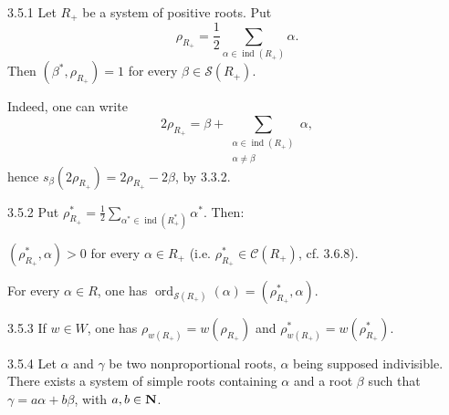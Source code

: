 \begin{proposition}{3.5.1}\label{XXI.3.5.1}
Let $R_+$ be a system of positive roots. Put
\[
\rho_{R_+}=\frac12\sum_{\alpha\in\operatorname{ind}(R_+)}\alpha.
\]
Then $(\beta^*,\rho_{R_+})=1$ for every $\beta\in\mathcal S(R_+)$.
\end{proposition}
Indeed, one can write
\[
2\rho_{R_+}=\beta+\sum_{\substack{\alpha\in\operatorname{ind}(R_+)\\\alpha\ne\beta}}\alpha,
\]
hence $s_\beta(2\rho_{R_+})=2\rho_{R_+}-2\beta$, by 3.3.2.
\begin{corollary}{3.5.2}\label{XXI.3.5.2}
Put $\rho_{R_+}^*=\frac12\sum_{\alpha^*\in\operatorname{ind}(R_+^*)}\alpha^*$. Then:
\begin{enumeratei}
\item $(\rho_{R_+}^*,\alpha)>0$ for every $\alpha\in R_+$ (i.e. $\rho_{R_+}^*\in\mathcal C(R_+)$, cf. 3.6.8).
\item For every $\alpha\in R$, one has $\operatorname{ord}_{\mathcal S(R_+)}(\alpha)=(\rho_{R_+}^*,\alpha)$.{\renewcommand{\thefootnote}{(12)}}
\end{enumeratei}
\end{corollary}
\begin{remark}{3.5.3}\label{XXI.3.5.3}
If $w\in W$, one has $\rho_{w(R_+)}=w(\rho_{R_+})$ and $\rho_{w(R_+)}^*=w(\rho_{R_+}^*)$.
\end{remark}
\begin{proposition}{3.5.4}\label{XXI.3.5.4}
Let $\alpha$ and $\gamma$ be two nonproportional roots, $\alpha$ being supposed indivisible. There exists a system of simple roots containing $\alpha$ and a root $\beta$ such that $\gamma=a\alpha+b\beta$, with $a,b\in\mathbf{N}$.
\end{proposition}
